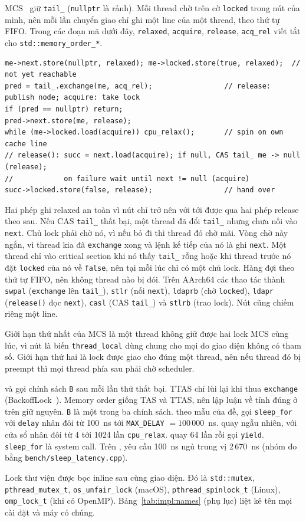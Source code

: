 MCS~\cite{mellorcrummey1991mcs} giữ \texttt{tail\_} (\texttt{nullptr} là rảnh). Mỗi thread chờ trên cờ
\texttt{locked} trong nút của mình, nên mỗi lần chuyển giao chỉ ghi một line của một thread, theo thứ tự
FIFO. Trong các đoạn mã dưới đây, \texttt{relaxed}, \texttt{acquire}, \texttt{release},
\texttt{acq\_rel} viết tắt cho \texttt{std::memory\_order\_*}.
\begin{lstlisting}
me->next.store(nullptr, relaxed); me->locked.store(true, relaxed);  // not yet reachable
pred = tail_.exchange(me, acq_rel);                 // release: publish node; acquire: take lock
if (pred == nullptr) return;
pred->next.store(me, release);
while (me->locked.load(acquire)) cpu_relax();       // spin on own cache line
// release(): succ = next.load(acquire); if null, CAS tail_ me -> null (release);
//            on failure wait until next != null (acquire)
succ->locked.store(false, release);                 // hand over
\end{lstlisting}
Hai phép ghi relaxed an toàn vì nút chỉ trở nên với tới được qua hai phép release theo sau. Nếu CAS
\texttt{tail\_} thất bại, một thread đã đổi \texttt{tail\_} nhưng chưa nối vào \texttt{next}. Chủ lock
phải chờ nó, vì nếu bỏ đi thì thread đó chờ mãi. Vòng chờ này ngắn, vì thread kia đã \texttt{exchange}
xong và lệnh kế tiếp của nó là ghi \texttt{next}. Một thread chỉ vào critical section khi nó thấy
\texttt{tail\_} rỗng hoặc khi thread trước nó đặt \texttt{locked} của nó về \texttt{false}, nên tại mỗi
lúc chỉ có một chủ lock. Hàng đợi theo thứ tự FIFO, nên không thread nào bị
đói. Trên AArch64 các thao tác thành \texttt{swpal}
(\texttt{exchange} lên \texttt{tail\_}), \texttt{stlr} (nối \texttt{next}), \texttt{ldaprb} (chờ
\texttt{locked}), \texttt{ldapr} (\texttt{release()} đọc \texttt{next}), \texttt{casl} (CAS
\texttt{tail\_}) và \texttt{stlrb} (trao lock). Nút  cũng chiếm riêng một line.

Giới hạn thứ nhất của MCS là một thread không giữ được hai lock MCS cùng lúc, vì nút là biến
\texttt{thread\_local} dùng chung cho mọi  do giao diện không có tham số. Giới hạn thứ
hai là lock được giao cho đúng một thread, nên nếu thread đó bị preempt thì mọi thread phía sau phải chờ
scheduler.

 và  gọi chính sách \texttt{B} sau mỗi lần thử thất bại.
TTAS chỉ lùi lại khi thua \texttt{exchange} (BackoffLock~\cite{herlihy2020art}). Memory order giống TAS và
TTAS, nên lập luận về tính đúng ở trên giữ nguyên. \texttt{B} là một trong
ba chính sách.  theo mẫu của đề, gọi \texttt{sleep\_for} với \texttt{delay} nhân đôi từ
100~ns tới \texttt{MAX\_DELAY} $= 100\,000$~ns.  quay ngẫu nhiên, với cửa sổ nhân đôi từ 4
tới 1024 lần \texttt{cpu\_relax}.  quay 64 lần rồi gọi \texttt{yield}. \texttt{sleep\_for}
là system call. Trên , yêu cầu 100~ns ngủ trung vị 2\,670~ns (nhóm đo bằng
\texttt{bench/sleep\_latency.cpp}).

Lock thư viện được bọc inline sau cùng giao diện. Đó là \texttt{std::mutex}, \texttt{pthread\_mutex\_t},
\texttt{os\_unfair\_lock} (macOS), \texttt{pthread\_spinlock\_t} (Linux), \texttt{omp\_lock\_t} (khi có
OpenMP). Bảng~\ref{tab:impl:names} (phụ lục) liệt kê tên mọi cài đặt và máy có chúng.
